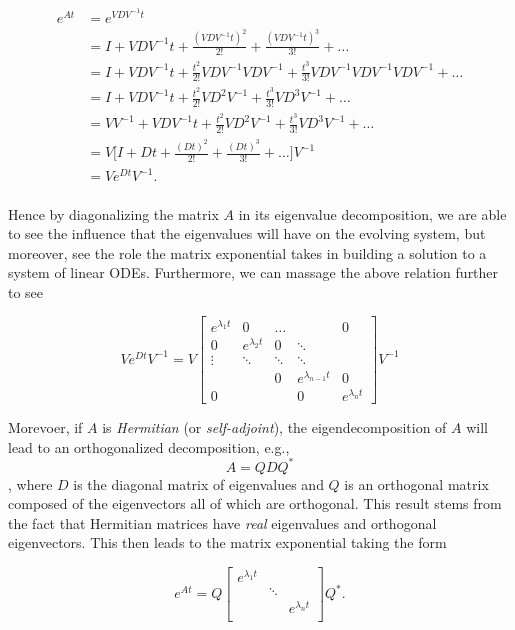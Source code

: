 \begin{align*}
e^{At} &= e^{VDV^{-1}t} \\
&= I + VDV^{-1}t + \frac{ (VDV^{-1}t)^2}{2!} +  \frac{ (VDV^{-1}t)^3}{3!} + \ldots \\
&= I + VDV^{-1}t + \frac{t^2}{2!} VDV^{-1}VDV^{-1} +  \frac{t^3}{3!}VDV^{-1}VDV^{-1} VDV^{-1} + \ldots \\
&= I + VDV^{-1}t + \frac{t^2}{2!} VD^2V^{-1} +  \frac{t^3}{3!}VD^3V^{-1} + \ldots\\
&= VV^{-1} +  VDV^{-1}t + \frac{t^2}{2!} VD^2V^{-1} +  \frac{t^3}{3!}VD^3V^{-1} + \ldots \\
&= V \Big[ I + Dt + \frac{(Dt)^2}{2!} + \frac{(Dt)^3}{3!} + \ldots  \Big] V^{-1} \\
&= V e^{Dt} V^{-1}. \\
\end{align*}

Hence by diagonalizing the matrix $A$ in its eigenvalue decomposition, we are able to see the influence that the eigenvalues will have on the evolving system, but moreover, see the role the matrix exponential takes in building a solution to a system of linear ODEs. Furthermore, we can massage the above relation further to see

\begin{equation*}V e^{Dt} V^{-1} = V \left[ \begin{array}{ccccc} 
e^{\lambda_1 t} & 0 &\dots  &  & 0 \\  
0 & e^{\lambda_2 t} & 0 & \ddots & \\
\vdots & \ddots & \ddots & \ddots & \\
 & &0  & e^{\lambda_{n-1}t} & 0 \\
0 &   & & 0& e^{\lambda_n t} \end{array} \right] V^{-1}
\end{equation*}

Morevoer, if $A$ is \emph{Hermitian} (or \emph{self-adjoint}), the eigendecomposition of $A$ will lead to an orthogonalized decomposition, e.g., 
$$A=QDQ^*$$, 
%
where $D$ is the diagonal matrix of eigenvalues and $Q$ is an orthogonal matrix composed of the eigenvectors all of which are orthogonal. This result stems from the fact that Hermitian matrices have \emph{real} eigenvalues and orthogonal eigenvectors. This then leads to the matrix exponential taking the form

$$e^{At} = Q \left[ \begin{array}{ccc} 
e^{\lambda_1 t} & & \\
& \ddots & \\
& & e^{\lambda_n t} \\
 \end{array} \right] Q^*.$$

